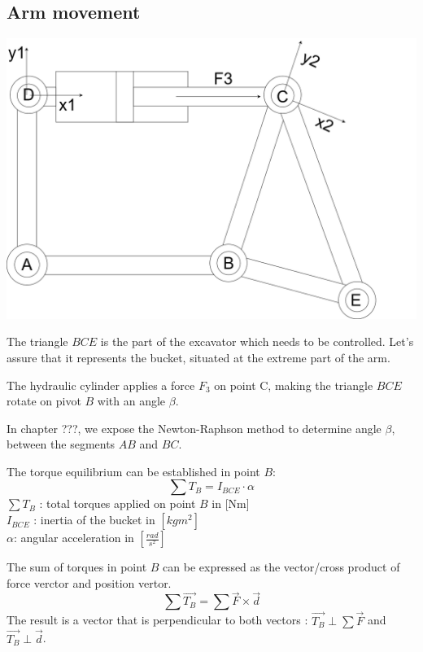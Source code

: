 \documentclass[12pt,a4paper]{article}
\begin{document}
	\subsection{Arm movement}
	\includegraphics[scale=.35]{Quadrilatere.drawio.png}
	
	The triangle $BCE$ is the part of the excavator which needs to be controlled. Let's assure that it represents the bucket, situated at the extreme part of the arm. 
	
	The hydraulic cylinder applies a force $F_3$ on point C, making the triangle $BCE$ rotate on pivot $B$ with an angle $\beta$. 
	
	
	In chapter ???, we expose the Newton-Raphson method to determine angle $\beta$, between the segments $AB$ and $BC$.
	
	The torque equilibrium can be established in point $B$:
	\begin{equation}
		\sum T_B = I_{BCE} \cdot \alpha
	\end{equation}
	$\sum T_B$ : total torques applied on point $B$ in [Nm]\\
	$I_{BCE}$ : inertia of the bucket in $[kg m^2]$\\
	$\alpha$: angular acceleration in $[\frac{rad}{s^2}] $
	
	The sum of torques in point $B$ can be expressed as the vector/cross product of force verctor and position vertor. 
	\begin{equation}
		\sum \vec{T_B} = \sum \vec{F} \times \vec{d}
	\end{equation}
	The result is a vector that is perpendicular to both vectors : 
	$\vec{T_B} \perp \sum \vec{F}$ and 
	$\vec{T_B} \perp \vec{d}$.
	
\end{document}
